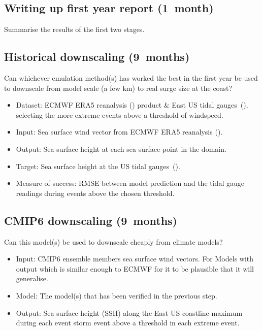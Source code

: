 \documentclass[usenames, dvipsnames]{article}      %
\begin{document}
\subsection*{Writing up first year report (1~month)}

Summarise the results of the first two stages.

\subsection*{Historical downscaling (9~months)}

Can whichever emulation method(s) has worked the best 
in the first year be used to downscale from 
model scale (a few km) to real surge size
at the coast?


\begin{itemize}
    \item Dataset: ECMWF ERA5 reanalysis
        (\cite{Zuo2019TheAssessment}) product 
        \& East US tidal gauges~(\cite{CO-OPSCurrents}), 
        selecting the more extreme events above 
        a threshold of windspeed.
    \item Input: Sea surface wind vector from ECMWF ERA5 reanalysis
    (\cite{Zuo2019TheAssessment}).
    \item Output: Sea surface 
        height at each sea surface point
        in the domain.
    \item Target: Sea surface height at the US tidal
        gauges~(\cite{CO-OPSCurrents}).
    \item Measure of success: RMSE between model prediction
        and the tidal gauge readings during events
        above the chosen threshold. 
\end{itemize}

\subsection*{CMIP6 downscaling (9~months)}

Can this model(s) be used to downscale cheaply from climate models?

\begin{itemize}
    \item Input: CMIP6 ensemble members sea surface wind vectors.
        For Models with output which is 
        similar enough to ECMWF for it to be plausible that
        it will generalise.
    \item Model: The model(s) that has been verified
        in the previous step.
    \item Output: Sea surface height (SSH) along the
        East US
        coastline maximum during each event storm
        event above a threshold in each extreme event.
\end{itemize}
\end{document}
